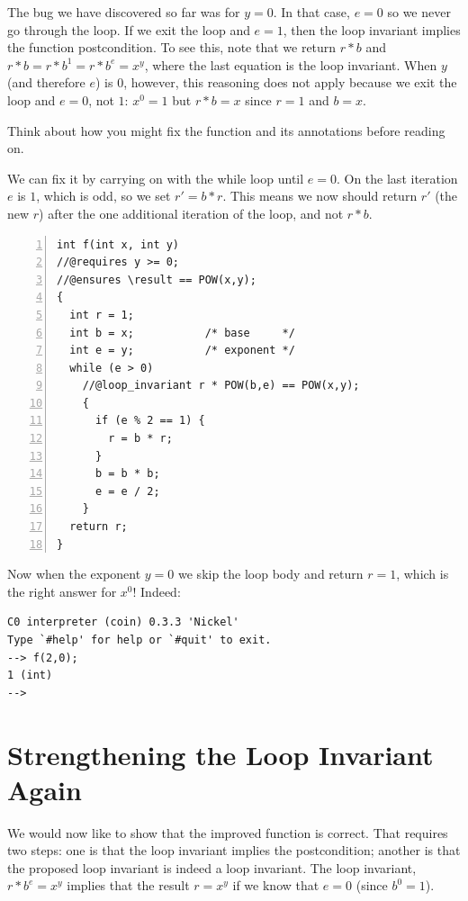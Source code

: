 The bug we have discovered so far was for $y = 0$.  In that case, $e = 0$ so
we never go through the loop.  If we exit the loop and $e = 1$, then the loop
invariant implies the function postcondition.  To see this, note that we
return $r*b$ and $r * b = r * b^1 = r * b^e = x^y$, where the last equation is
the loop invariant.  When $y$ (and therefore $e$) is $0$, however, this
reasoning does not apply because we exit the loop and $e = 0$, not $1$: $x^0 =
1$ but $r*b = x$ since $r=1$ and $b=x$.

Think about how you might fix the function and its annotations
before reading on.

\clearpage
We can fix it by carrying on with the while loop until $e = 0$.
On the last iteration $e$ is $1$, which is odd, so we set
$r' = b * r$.  This means we now should return $r'$ (the new $r$)
after the one additional iteration of the loop, and not $r*b$.

\begin{lstlisting}[language={[C0]C}, numbers=left]
int f(int x, int y)
//@requires y >= 0;
//@ensures \result == POW(x,y);
{
  int r = 1;
  int b = x;           /* base     */
  int e = y;           /* exponent */
  while (e > 0)
    //@loop_invariant r * POW(b,e) == POW(x,y);
    {
      if (e % 2 == 1) {
        r = b * r;
      }
      b = b * b;
      e = e / 2;
    }
  return r;
}
\end{lstlisting}

\noindent
Now when the exponent $y = 0$ we skip the loop body and
return $r = 1$, which is the right answer for $x^0$!
Indeed:
\begin{lstlisting}[language={[coin]C}]
% coin mystery2e.c0 -d
C0 interpreter (coin) 0.3.3 'Nickel'
Type `#help' for help or `#quit' to exit.
--> f(2,0);
1 (int)
-->
\end{lstlisting}


\clearpage
\section{Strengthening the Loop Invariant Again}
\label{sec:contracts:loop_invariants_for_proofs}

We would now like to show that the improved function is correct.  That
requires two steps: one is that the loop invariant implies the
postcondition; another is that the proposed loop invariant is indeed a
loop invariant.  The loop invariant, $r * b^e = x^y$ implies
that the result $r = x^y$ if we know that $e = 0$ (since $b^0 = 1$).

